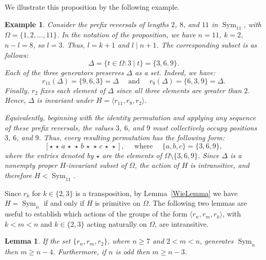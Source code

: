 \documentclass[
final
]{dmtcs-episciences}
\newtheorem{lemma}{Lemma}
\newtheorem{example}{Example}
\DeclareMathOperator{\Sym}{\mathrm{Sym}}
\begin{document}
We illustrate this proposition by the following example.

\begin{example}
Consider the prefix reversals of lengths $2$, $8$, and $11$ in $\Sym_{11}$, with $\Omega=\{1,2,\ldots,11\}$. In the notation of the proposition, we have $n=11$, $k=2$, $n-l=8$, so $l=3$. Thus, $l=k+1$ and $l\mid n+1$. The corresponding subset is as follows:
\[
\Delta=\{t\in\Omega:3\mid t\}=\{3,6,9\}.
\]
Each of the three generators preserves $\Delta$ as a set. Indeed, we have:
\[
r_{11}(\Delta)
 =\{9,6,3\}
 =\Delta
\quad
\text{ and }
\quad
r_8(\Delta)
 =\{6,3,9\}
 =\Delta.
\]
Finally, $r_2$ fixes each element of $\Delta$ since all three elements are greater than $2$. Hence, $\Delta$ is invariant under
$H=\langle r_{11},r_8,r_2\rangle.$

Equivalently, beginning with the identity permutation and applying any sequence of these prefix reversals, the values $3$, $6$, and $9$ must collectively occupy positions $3$, $6$, and $9$. Thus, every resulting permutation has the following form:
\[
[\star\,\star\,a\,\star\,\star\,b\,\star\,\star\,c\,\star\,\star],
\quad\text{ where }\quad
\{a,b,c\}=\{3,6,9\},
\]
where the entries denoted by $\star$ are the elements of
$\Omega\setminus\{3,6,9\}$. Since $\Delta$ is a nonempty proper $H$-invariant subset of $\Omega$, the action of $H$ is intransitive, and therefore $H<\Sym_{11}$.
\end{example}

Since $r_k$ for $k\in \{2,3\}$ is a transposition, by Lemma~\ref{WieLemma} we have $H = \Sym_n$ if and only if $H$ is primitive on $\Omega$. The following two lemmas are useful to establish which actions of the groups of the form $\langle r_n,r_m,r_k\rangle$, with $k<m<n$ and $k\in\{2,3\}$ acting naturally on $\Omega$, are intransitive. 

\begin{lemma}\label{lem:n-4_2}
    If the set $\{r_n,r_m,r_2\}$, where $n\geqslant 7$ and $2<m<n$, generates $\Sym_n$ then $m\geqslant n-4$. Furthermore, if $n$ is odd then $m\geqslant n-3$.
\end{lemma}
\end{document}
